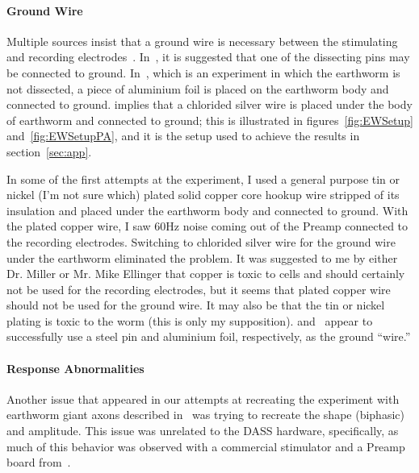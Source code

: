 \paragraph{Ground Wire} Multiple sources insist that a ground wire is necessary between the stimulating and recording electrodes~\cite{StahlMSEE,Olivo,KuehJellies,EllingerMSEE,Kladt2010}.  In~\cite{Olivo}, it is suggested that one of the dissecting pins may be connected to ground.  In~\cite{Kladt2010}, which is an experiment in which the earthworm is not dissected, a piece of aluminium foil is placed on the earthworm body and connected to ground.  \cite{KuehJellies} implies that a chlorided silver wire is placed under the body of earthworm and connected to ground; this is illustrated in figures~\ref{fig:EWSetup} and~\ref{fig:EWSetupPA}, and it is the setup used to achieve the results in section~\ref{sec:app}.

In some of the first attempts at the experiment, I used a general purpose tin or nickel (I'm not sure which) plated solid copper core hookup wire stripped of its insulation and placed under the earthworm body and connected to ground.  With the plated copper wire, I saw 60Hz noise coming out of the Preamp connected to the recording electrodes.  Switching to chlorided silver wire for the ground wire under the earthworm eliminated the problem.  It was suggested to me by either Dr. Miller or Mr. Mike Ellinger that copper is toxic to cells and should certainly not be used for the recording electrodes, but it seems that plated copper wire should not be used for the ground wire.  It may also be that the tin or nickel plating is toxic to the worm (this is only my supposition).  \cite{Olivo} and~\cite{Kladt2010} appear to successfully use a steel pin and aluminium foil, respectively, as the ground ``wire.''

\paragraph{Response Abnormalities} Another issue that appeared in our attempts at recreating the experiment with earthworm giant axons described in~\cite{StahlMSEE,Olivo,KuehJellies,EllingerMSEE} was trying to recreate the shape (biphasic) and amplitude.  This issue was unrelated to the DASS hardware, specifically, as much of this behavior was observed with a commercial stimulator and a Preamp board from~\cite{BatzerCorsiCrampton}.

